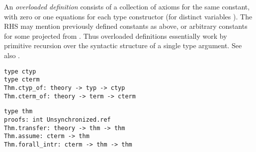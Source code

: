 \begin{isabellebody}
\begin{isamarkuptext}
  An \emph{overloaded definition} consists of a collection of axioms
  for the same constant, with zero or one equations  for each type constructor  (for
  distinct variables ).  The RHS may mention
  previously defined constants as above, or arbitrary constants  for some  projected from .  Thus overloaded definitions essentially work by
  primitive recursion over the syntactic structure of a single type
  argument.  See also \cite[\S4.3]{Haftmann-Wenzel:2006:classes}.%
\end{isamarkuptext}%
\isamarkuptrue%
%
\isadelimmlref
%
\endisadelimmlref
%
\isatagmlref
%
\begin{isamarkuptext}%
\begin{mldecls}
  \verb|type ctyp| \\
  \verb|type cterm| \\
  \verb|Thm.ctyp_of: theory -> typ -> ctyp| \\
  \verb|Thm.cterm_of: theory -> term -> cterm| \\
  \end{mldecls}
  \begin{mldecls}
  \verb|type thm| \\
  \verb|proofs: int Unsynchronized.ref| \\
  \verb|Thm.transfer: theory -> thm -> thm| \\
  \verb|Thm.assume: cterm -> thm| \\
  \verb|Thm.forall_intr: cterm -> thm -> thm| \\

\end{mldecls}
\end{isamarkuptext}
\end{isabellebody}
